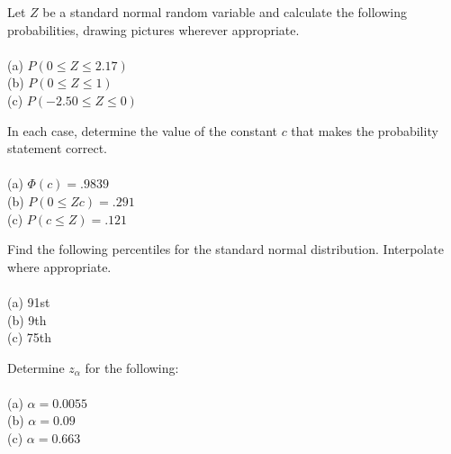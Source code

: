 \documentclass[12pt,letterpaper]{hmcpset}
\begin{document}
\begin{solution}

\end{solution}
\newpage

\begin{problem}[4.3.28]
Let $Z$ be a standard normal random variable and calculate
the following probabilities, drawing pictures wherever
appropriate.\\
\\(a) $P(0 \leq Z \leq 2.17)$
\\(b) $P(0 \leq Z \leq 1)$
\\(c) $P(-2.50 \leq Z \leq 0)$

\end{problem}

\begin{solution}

\end{solution}
\newpage

\begin{problem}[4.3.29]
In each case, determine the value of the constant $c$ that
makes the probability statement correct.\\
\\(a) $\Phi(c) = .9839$
\\(b) $P(0 \leq Z c) = .291$
\\(c) $P(c \leq Z) = .121$

\end{problem}

\newpage

\begin{problem}[4.3.30]
Find the following percentiles for the standard normal distribution.
Interpolate where appropriate.\\
\\(a) 91st
\\(b) 9th
\\(c) 75th

\end{problem}

\begin{solution}

\end{solution}
\newpage

\begin{problem}[4.3.31]
Determine $z_\alpha$ for the following:\\
\\(a) $\alpha = 0.0055$
\\(b) $\alpha = 0.09$
\\(c) $\alpha = 0.663$

\end{problem}
\end{document}
